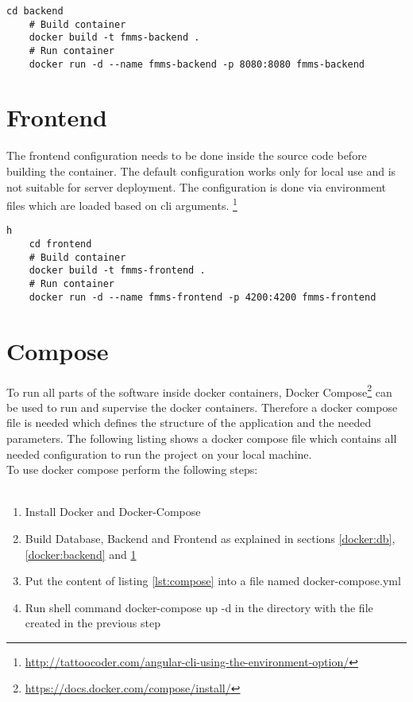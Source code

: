 \begin{minipage}{\textwidth}
	\begin{lstlisting}[caption={Build Backend Container}]
	cd backend
	# Build container
	docker build -t fmms-backend .
	# Run container
	docker run -d --name fmms-backend -p 8080:8080 fmms-backend
	\end{lstlisting}
\end{minipage}


\section{Frontend}
\label{docker:frontend}

The frontend configuration needs to be done inside the source code before building the container.
The default configuration works only for local use and is not suitable for server deployment.
The configuration is done via environment files which are loaded based on cli arguments. \footnote{\url{http://tattoocoder.com/angular-cli-using-the-environment-option/}}

\begin{minipage}{\textwidth}
	\begin{lstlisting}[caption={Build Frontend Container}]h
	cd frontend
	# Build container
	docker build -t fmms-frontend .
	# Run container
	docker run -d --name fmms-frontend -p 4200:4200 fmms-frontend
	\end{lstlisting}
\end{minipage}




\section{Compose}
\label{docker:compose}
To run all parts of the software inside docker containers, Docker Compose\footnote{\url{https://docs.docker.com/compose/install/}} can be used to run and supervise the docker containers.
Therefore a docker compose file is needed which defines the structure of the application and the needed parameters.
The following listing shows a docker compose file which contains all needed configuration to run the project on your local machine.
~\\
To use docker compose perform the following steps: \\ \\
\begin{minipage}{\textwidth}
	\begin{enumerate}
		\item Install Docker and Docker-Compose
		\item Build Database, Backend and Frontend as explained in sections \ref{docker:db}, \ref{docker:backend} and \ref{docker:frontend}
		\item Put the content of listing \ref{lst:compose} into a file named \glqq docker-compose.yml\grqq
		\item Run shell command \glqq docker-compose up -d\grqq{} in the directory with the file created in the previous step
	\end{enumerate}
\end{minipage}

\begin{minipage}{\textwidth}
	
\end{minipage}
